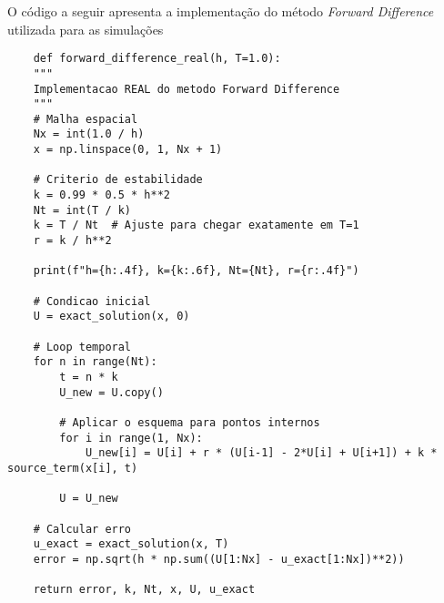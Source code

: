 \documentclass[10pt,twocolumn]{article}
\begin{document}
O código a seguir apresenta a implementação do método \textit{Forward Difference} utilizada para as simulações
\begin{verbatim}
    def forward_difference_real(h, T=1.0):
    """
    Implementacao REAL do metodo Forward Difference
    """
    # Malha espacial
    Nx = int(1.0 / h)
    x = np.linspace(0, 1, Nx + 1)

    # Criterio de estabilidade
    k = 0.99 * 0.5 * h**2
    Nt = int(T / k)
    k = T / Nt  # Ajuste para chegar exatamente em T=1
    r = k / h**2

    print(f"h={h:.4f}, k={k:.6f}, Nt={Nt}, r={r:.4f}")

    # Condicao inicial
    U = exact_solution(x, 0)

    # Loop temporal
    for n in range(Nt):
        t = n * k
        U_new = U.copy()

        # Aplicar o esquema para pontos internos
        for i in range(1, Nx):
            U_new[i] = U[i] + r * (U[i-1] - 2*U[i] + U[i+1]) + k * source_term(x[i], t)

        U = U_new

    # Calcular erro
    u_exact = exact_solution(x, T)
    error = np.sqrt(h * np.sum((U[1:Nx] - u_exact[1:Nx])**2))

    return error, k, Nt, x, U, u_exact
\end{verbatim}
\end{document}
